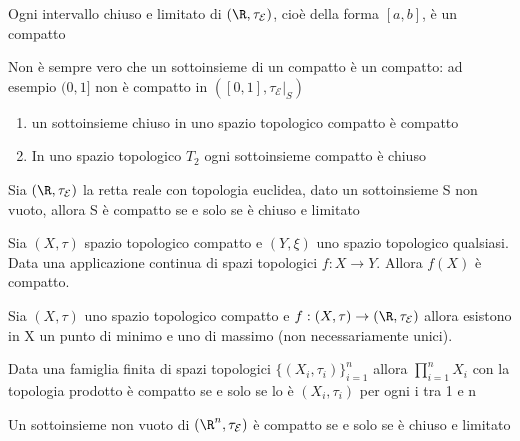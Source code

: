 \documentclass[a4paper]{article}
\begin{document}
\begin{teo}  
	Ogni intervallo chiuso e limitato di $(\R , \tau_{\mathcal{E} })$, cioè della forma $[a,b]$, è un compatto
\end{teo}

\begin{oss}
	Non è sempre vero che un sottoinsieme di un compatto è un compatto: ad esempio $(0,1]$ non è compatto in $([0,1],\tau_{\mathcal{E} }|_S)$
	
\end{oss}

\begin{prop}
	\begin{enumerate}
		\item un sottoinsieme chiuso in uno spazio topologico compatto è compatto
		\item In uno spazio topologico $T_2$ ogni sottoinsieme compatto è chiuso
	\end{enumerate}
\end{prop}

\begin{cor}
	Sia $(\R , \tau_{\mathcal{E} })$ la retta reale con topologia euclidea, dato un sottoinsieme S non vuoto, allora S è compatto se e solo se è chiuso e limitato
\end{cor}

\begin{prop}
	Sia $(X,\tau)$ spazio topologico compatto e $(Y,\xi)$ uno spazio topologico qualsiasi. Data una applicazione continua di spazi topologici $f:X\to Y$. Allora $f(X)$ è compatto.
\end{prop}

\begin{cor} [Weiestrass]
	Sia $(X,\tau)$ uno spazio topologico compatto e $f:(X,\tau) \to (\R , \tau_{\mathcal{E} })$ allora esistono in X un punto di minimo e uno di massimo (non necessariamente unici).
\end{cor}

\begin{teo} [di Tychonoff]
	Data una famiglia finita di spazi topologici $\{ (X_i , \tau_i)\}_{i=1}^n$ allora $\prod_{i=1}^n X_i$ con la topologia prodotto è compatto se e solo se lo è $(X_i , \tau_i)$ per ogni i tra 1 e n
	
\end{teo}

\begin{cor} 
	Un sottoinsieme non vuoto di $(\R^n ,\tau_{\mathcal{E} })$ è compatto se e solo se è chiuso e limitato
	
\end{cor}
\end{document}
